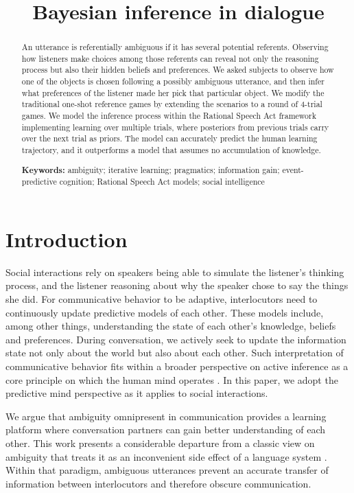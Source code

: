 \documentclass[10pt,a4paper]{article}
\title{Bayesian inference in dialogue}
\begin{document}
\maketitle

\begin{abstract}
	
An utterance is referentially ambiguous if it has several potential referents. Observing how listeners make choices among those referents can reveal not only the reasoning process but also their hidden beliefs and preferences. We asked subjects to observe how one of the objects is chosen following a possibly ambiguous utterance, and then infer what preferences of the listener made her pick that particular object. We modify the traditional one-shot reference games by extending the scenarios to a round of 4-trial games. We model the inference process within the Rational Speech Act framework implementing learning over multiple trials, where posteriors from previous trials carry over the next trial as priors. The model can accurately predict the human learning trajectory, and it outperforms a model that assumes no accumulation of knowledge.                                                      

\textbf{Keywords:} 
ambiguity; iterative learning; pragmatics; information gain; event-predictive cognition; Rational Speech Act models; social intelligence
\end{abstract}

\section{Introduction}

Social interactions rely on speakers being able to simulate the listener's thinking process, and the listener reasoning about why the speaker chose to say the things she did. For communicative behavior to be adaptive, interlocutors need to continuously update predictive models of each other. These models include, among other things, understanding the state of each other's knowledge, beliefs and preferences. During conversation, we actively seek to update the information state not only about the world but also about each other. Such interpretation of communicative behavior fits within a broader perspective on active inference as a core principle on which the human mind operates \cite{Friston:2015, Hohwy:2013, Clark:2016}. In this paper, we adopt the predictive mind perspective as it applies to social interactions.

We argue that ambiguity omnipresent in communication provides a learning platform where conversation partners can gain better understanding of each other. This work presents a considerable departure from a classic view on ambiguity that treats it as an inconvenient side effect of a language system \cite{grice1975,chomsky2002minimalism}. Within that paradigm, ambiguous utterances prevent an accurate transfer of information between interlocutors and therefore obscure communication. 
\end{document}
